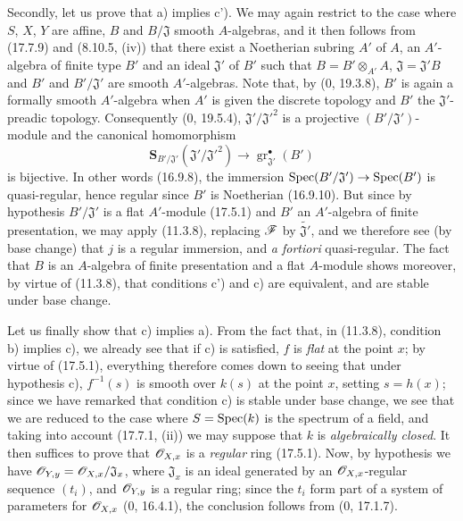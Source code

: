 Secondly, let us prove that a) implies c'). We may again restrict to the case where $S$, $X$, $Y$ are affine, $B$ and $B/\mathfrak J$ smooth $A$-algebras, and it then follows from (17.7.9) and (8.10.5, (iv)) that there exist a Noetherian subring $A'$ of $A$, an $A'$-algebra of finite type $B'$ and an ideal $\mathfrak J'$ of $B'$ such that $B=B'\otimes_{A'}A$, $\mathfrak J=\mathfrak J'B$ and $B'$ and $B'/\mathfrak J'$ are smooth $A'$-algebras. Note that, by (0, 19.3.8), $B'$ is again a formally smooth $A'$-algebra when $A'$ is given the discrete topology and $B'$ the $\mathfrak J'$-preadic topology. Consequently (0, 19.5.4), $\mathfrak J'/\mathfrak J'^2$ is a projective $(B'/\mathfrak J')$-module and the canonical homomorphism
\[
\mathbf{S}_{B'/\mathfrak J'}(\mathfrak J'/\mathfrak J'^2)\to\operatorname{gr}_{\mathfrak J'}^{\bullet}(B')
\]
is bijective. In other words (16.9.8), the immersion $\operatorname{Spec}(B'/\mathfrak J')\to\operatorname{Spec}(B')$ is quasi-regular, hence regular since $B'$ is Noetherian (16.9.10). But since by hypothesis $B'/\mathfrak J'$ is a flat $A'$-module (17.5.1) and $B'$ an $A'$-algebra of finite presentation, we may apply (11.3.8), replacing $\mathscr{F}$ by $\widetilde{\mathfrak J'}$, and we therefore see (by base change) that $j$ is a regular immersion, and \emph{a fortiori} quasi-regular. The fact that $B$ is an $A$-algebra of finite presentation and a flat $A$-module shows moreover, by virtue of (11.3.8), that conditions c') and c) are equivalent, and are stable under base change.

Let us finally show that c) implies a). From the fact that, in (11.3.8), condition b) implies c), we already see that if c) is satisfied, $f$ is \emph{flat} at the point $x$; by virtue of (17.5.1), everything therefore comes down to seeing that under hypothesis c), $f^{-1}(s)$ is smooth over $k(s)$ at the point $x$, setting $s=h(x)$; since we have remarked that condition c) is stable under base change, we see that we are reduced to the case where $S=\operatorname{Spec}(k)$ is the spectrum of a field, and taking into account (17.7.1, (ii)) we may suppose that $k$ is \emph{algebraically closed}. It then suffices to prove that $\mathscr{O}_{X,x}$ is a \emph{regular} ring (17.5.1). Now, by hypothesis we have $\mathscr{O}_{Y,y}=\mathscr{O}_{X,x}/\mathfrak J_x$, where $\mathfrak J_x$ is an ideal generated by an $\mathscr{O}_{X,x}$-regular sequence $(t_i)$, and $\mathscr{O}_{Y,y}$ is a regular ring; since the $t_i$ form part of a system of parameters for $\mathscr{O}_{X,x}$ (0, 16.4.1), the conclusion follows from (0, 17.1.7).

